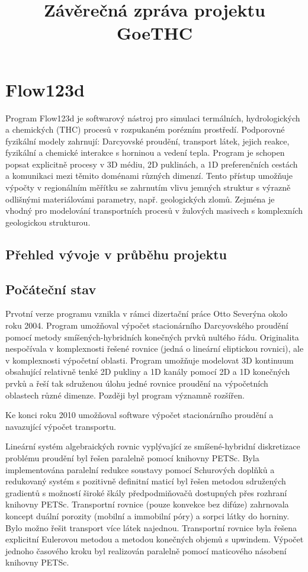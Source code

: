 \documentclass[11pt]{article}
\begin{document}

\title{Závěrečná zpráva projektu GoeTHC}
\maketitle


\section{Flow123d}
Program Flow123d je softwarový nástroj pro simulaci termálních, hydrologických 
a chemických (THC) procesů v rozpukaném porézním prostředí. Podporovné 
fyzikální modely zahrnují: Darcyovské proudění, transport látek, jejich reakce, 
fyzikální a chemické interakce s horninou a vedení tepla. Program je schopen 
popsat explicitně procesy v 3D médiu, 2D puklinách, a 1D preferenčních cestách a 
komunikaci mezi těmito doménami různých dimenzí. Tento přístup umožňuje výpočty 
v regionálním měřítku se zahrnutím vlivu jemných struktur s výrazně odlišnými 
materiálovámi parametry, např. geologických zlomů. Zejména je vhodný pro  
modelování transportních procesů v žulových masivech s komplexních geologickou 
strukturou.  


\subsection{Přehled vývoje v průběhu projektu}


\subsection{Počáteční stav}
Prvotní verze programu vznikla v rámci dizertační práce 
Otto Severýna okolo roku 2004. Program umožňoval výpočet stacionárního 
Darcyovského proudění pomocí metody smíšených-hybridních konečných prvků 
nultého řádu. Originalita nespočívala v komplexnosti řešené rovnice (jedná o 
lineární eliptickou rovnici), ale v komplexnosti výpočetní oblasti. Program 
umožňuje modelovat 3D kontinuum obsahující relativně tenké 2D pukliny a 1D 
kanály pomocí 2D a 1D konečných prvků a řeší tak sdruženou úlohu jedné rovnice 
proudění na výpočetních oblastech různé dimenze. Později byl program významně 
rozšířen.

Ke konci roku 2010 umožňoval software výpočet stacionárního proudění a 
navazující výpočet transportu. 

Lineární systém algebraických rovnic vyplývající 
ze smíšené-hybridní diskretizace problému proudění byl řešen paralelně pomocí 
knihovny PETSc. Byla implementována paralelní redukce soustavy pomocí 
Schurových doplňků a redukovaný systém s pozitivně definitní maticí byl řešen 
metodou sdružených gradientů s možností široké škály předpodmiňovačů dostupných 
přes rozhraní knihovny PETSc. Transportní rovnice (pouze konvekce bez difúze) 
zahrnovala koncept duální porozity (mobilní a immobilní póry) a sorpci látky 
do horniny. Bylo možno řešit transport více látek najednou. Transportní rovnice 
byla řešena explicitní Eulerovou metodou a metodou konečných objemů s upwindem.  
Výpočet jednoho časového kroku byl realizován paralelně pomocí maticového 
násobení knihovny PETSc. 
\end{document}
